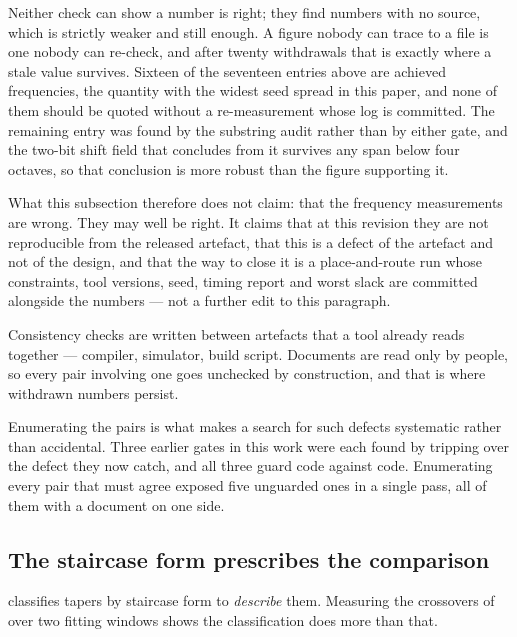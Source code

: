 Neither check can show a number is right; they find numbers with no source, which
is strictly weaker and still enough. A figure nobody can trace to a file is one
nobody can re-check, and after twenty withdrawals that is exactly where a stale
value survives. Sixteen of the seventeen entries above are achieved frequencies,
the quantity with the widest seed spread in this paper, and none of them should be
quoted without a re-measurement whose log is committed. The remaining entry was
found by the substring audit rather than by either gate, and the two-bit shift
field that  concludes from it survives any span below
four octaves, so that conclusion is more robust than the figure supporting it.

What this subsection therefore does not claim: that the frequency measurements are
wrong. They may well be right. It claims that at this revision they are not
reproducible from the released artefact, that this is a defect of the artefact and
not of the design, and that the way to close it is a place-and-route run whose
constraints, tool versions, seed, timing report and worst slack are committed
alongside the numbers --- not a further edit to this paragraph.

\begin{theorem}
\label{thm:doctrace}
Consistency checks are written between artefacts that a tool already reads
together --- compiler, simulator, build script. Documents are read only by
people, so every pair involving one goes unchecked by construction, and that is
where withdrawn numbers persist.
\end{theorem}

Enumerating the pairs is what makes a search for such defects systematic rather
than accidental. Three earlier gates in this work were each found by tripping
over the defect they now catch, and all three guard code against code.
Enumerating every pair that must agree exposed five unguarded ones in a single
pass, all of them with a document on one side.



\subsection{The staircase form prescribes the comparison}
\label{sec:formprescribes}

 classifies tapers by staircase form to \emph{describe}
them. Measuring the crossovers of  over two fitting
windows shows the classification does more than that.


